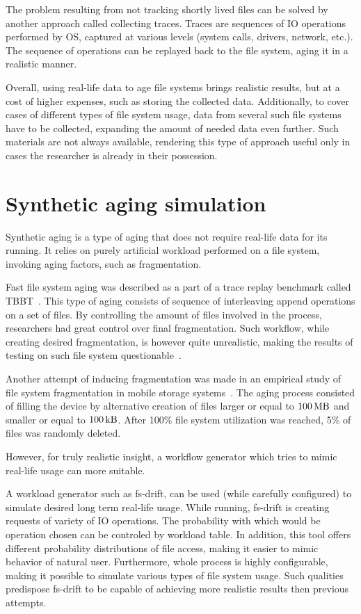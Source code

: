 \documentclass[
  color, %
  table, %
  lof,   %
  lot,   %
]{fithesis3}
\begin{document}
The problem resulting from not tracking shortly lived files can be solved by another approach called collecting traces. Traces are sequences of IO operations performed by OS, captured at various levels (system calls, drivers, network, etc.). The sequence of operations can be replayed back to the file system, aging it in a realistic manner.

Overall, using real-life data to age file systems brings realistic results, but at a cost of higher expenses, such as storing the collected data. Additionally, to cover cases of different types of file system usage, data from several such file systems have to be collected, expanding the amount of needed data even further. Such materials are not always available, rendering this type of approach useful only in cases the researcher is already in their possession.

\section{Synthetic aging simulation}
Synthetic aging is a type of aging that does not require real-life data for its running. It relies on purely artificial workload performed on a file system, invoking aging factors, such as fragmentation.

Fast file system aging was described as a part of a trace replay benchmark called TBBT~\cite{Zhu:2005:TSA:1251028.1251052}. This type of aging consists of sequence of interleaving append operations on a set of files. By controlling the amount of files involved in the process, researchers had great control over final fragmentation. Such workflow, while creating desired fragmentation, is however quite unrealistic, making the results of testing on such file system questionable~\cite{Traeger:2008:NYS:1367829.1367831}.

Another attempt of inducing fragmentation was made in an empirical study of file system fragmentation in mobile storage systems~\cite{ji2016empirical}. The aging process consisted of filling the device by alternative creation of files larger or equal to $\SI{100}{\mega\byte}$ and smaller or equal to $\SI{100}{\kilo\byte}$. After 100\% file system utilization was reached, 5\% of files was randomly deleted. 

However, for truly realistic insight, a workflow generator which tries to mimic real-life usage can more suitable.

A workload generator such as fs-drift\footnotemark[1], can be used (while carefully configured) to simulate desired long term real-life usage. While running, fs-drift is creating requests of variety of IO operations. The probability with which would be operation chosen can be controled by workload table. In addition, this tool offers different probability distributions of file access, making it easier to mimic behavior of natural user. Furthermore, whole process is highly configurable, making it possible to simulate various types of file system usage. Such qualities predispose fs-drift to be capable of achieving more realistic results then previous attempts.
\end{document}
